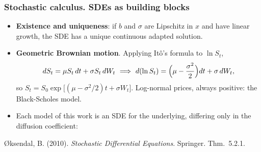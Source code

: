 \begin{frame}
\frametitle{Stochastic calculus. SDEs as building blocks}
\begin{scriptsize}
\begin{itemize}
\item \textbf{Existence and uniqueness}: if $b$ and $\sigma$ are Lipschitz in $x$ and have linear growth,
the SDE has a unique continuous adapted solution.
\item \textbf{Geometric Brownian motion}. Applying It\^{o}'s formula to $\ln S_t$,
\begin{equation*}
    dS_t = \mu S_t\, dt + \sigma S_t\, dW_t
    \ \Longrightarrow\
    d(\ln S_t) = \Bigl( \mu - \frac{\sigma^2}{2} \Bigr) dt + \sigma\, dW_t,
\end{equation*}
so $S_t = S_0 \exp\bigl[ (\mu - \sigma^2/2) t + \sigma W_t \bigr]$. Log-normal prices, always positive: the Black-Scholes model.
\item Each model of this work is an SDE for the underlying, differing only in the diffusion coefficient:
\end{itemize}
\end{scriptsize}

\begin{center}
\end{center}

\begin{scriptsize}
{\O}ksendal, B. (2010). \emph{Stochastic Differential Equations}. Springer. Thm.~5.2.1.
\end{scriptsize}
\end{frame}
